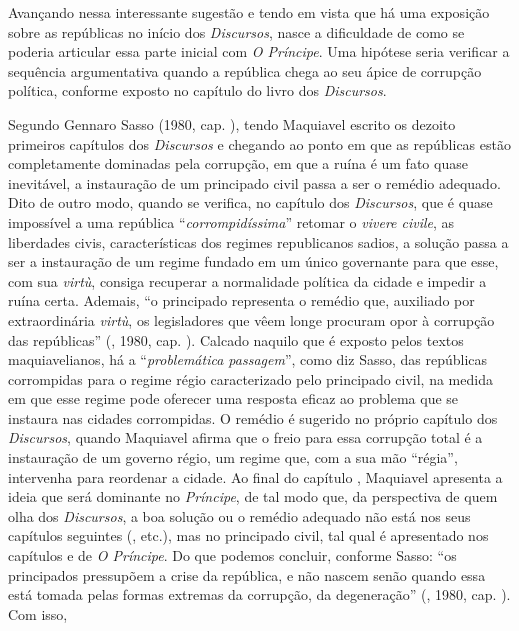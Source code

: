 Avançando nessa interessante sugestão e tendo em vista que há uma
exposição sobre as repúblicas no início dos \emph{Discursos}, nasce a
dificuldade de como se poderia articular essa parte inicial com \emph{O
Príncipe}. Uma hipótese seria verificar a sequência argumentativa quando
a república chega ao seu ápice de corrupção política, conforme exposto
no capítulo  do livro  dos \emph{Discursos}.

Segundo Gennaro Sasso (1980, cap. ), tendo Maquiavel escrito os dezoito
primeiros capítulos dos \emph{Discursos} e chegando ao ponto em que as
repúblicas estão completamente dominadas pela corrupção, em que a ruína
é um fato quase inevitável, a instauração de um principado civil passa a
ser o remédio adequado. Dito de outro modo, quando se verifica, no
capítulo  dos \emph{Discursos}, que é quase impossível a uma
república ``\emph{corrompidíssima}'' retomar o \emph{vivere civile}, as
liberdades civis, características dos regimes republicanos sadios, a
solução passa a ser a instauração de um regime fundado em um único
governante para que esse, com sua \emph{virtù}, consiga recuperar a
normalidade política da cidade e impedir a ruína certa. Ademais, ``o
principado representa o remédio que, auxiliado por extraordinária
\emph{virtù}, os legisladores que vêem longe procuram opor à corrupção
das repúblicas'' (, 1980, cap. ). Calcado naquilo
que é exposto pelos textos maquiavelianos, há a ``\emph{problemática
passagem}'', como diz Sasso, das repúblicas corrompidas para o regime
régio caracterizado pelo principado civil, na medida em que esse regime
pode oferecer uma resposta eficaz ao problema que se instaura nas
cidades corrompidas. O remédio é sugerido no próprio capítulo  dos
\emph{Discursos}, quando Maquiavel afirma que o freio para essa
corrupção total é a instauração de um governo régio, um regime que, com
a sua mão ``régia'', intervenha para reordenar a cidade. Ao final do
capítulo , Maquiavel apresenta a ideia que será dominante no
\emph{Príncipe}, de tal modo que, da perspectiva de quem olha dos
\emph{Discursos}, a boa solução ou o remédio adequado não está nos seus
capítulos seguintes (,  etc.), mas no principado civil, tal qual é
apresentado nos capítulos  e  de \emph{O Príncipe}. Do que podemos
concluir, conforme Sasso: ``os principados pressupõem a crise da
república, e não nascem senão quando essa está tomada pelas formas
extremas da corrupção, da degeneração'' (, 1980, cap. ). Com isso,
